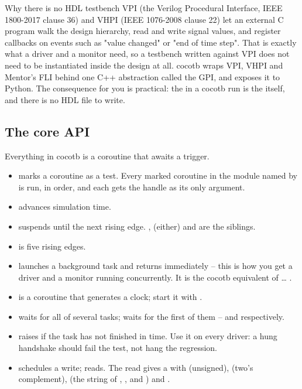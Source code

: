 \begin{notebox}{Why there is no HDL testbench}
VPI (the Verilog Procedural Interface, IEEE 1800-2017 clause 36) and VHPI
(IEEE 1076-2008 clause 22) let an external C program walk the design
hierarchy, read and write signal values, and register callbacks on events
such as "value changed" or "end of time step". That is exactly what a driver
and a monitor need, so a testbench written against VPI does not need to be
instantiated inside the design at all. cocotb wraps VPI, VHPI and Mentor's
FLI behind one C++ abstraction called the GPI, and exposes it to Python. The
consequence for you is practical: the  in a cocotb run is the
\DUT{} itself, and there is no HDL file to write.
\end{notebox}

\subsection{The core API}

Everything in cocotb is a coroutine that awaits a trigger.

\begin{itemize}
\item {} marks a coroutine as a test. Every marked
      coroutine in the module named by  is run, in order, and
      each gets the \DUT{} handle as its only argument.
\item {} advances simulation time.
\item {} suspends until the next rising
      edge. ,  (either) and 
      are the siblings.
\item {} is five rising edges.
\item {} launches a background task and
      returns immediately -- this is how you get a driver and a monitor
      running concurrently. It is the cocotb equivalent of  \dots
      .
\item {} is a coroutine that
      generates a clock; start it with .
\item {} waits for all of several tasks;
       waits for the first of them --
       and  respectively.
\item {} raises
       if the task has not finished in time. Use it on
      every driver: a hung handshake should fail the test, not hang the
      regression.
\item {} schedules a write;  reads.
      The read gives a  with  (unsigned),
       (two's complement),  (the string
      of , ,  and ) and .
\end{itemize}


